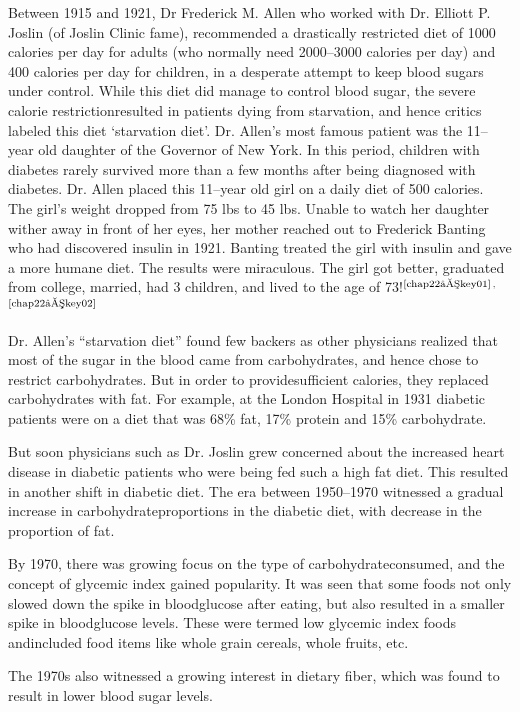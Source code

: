 Between 1915 and 1921, Dr Frederick M. Allen who worked with Dr. Elliott P. Joslin (of Joslin Clinic fame), recommended a drastically restricted diet of 1000 calories per day for adults (who normally need 2000–3000 calories per day) and 400 calories per day for children, in a desperate attempt to keep blood sugars under control. While this diet did manage to control blood sugar, the severe calorie restriction\break resulted in patients dying from starvation, and hence critics labeled this diet ‘starvation diet’. Dr. Allen’s most famous patient was the 11–year old daughter of the Governor of New York. In this period, children with diabetes rarely survived more than a few months after being dia\-gnosed with diabetes. Dr. Allen placed this 11–year old girl on a daily diet of 500 calories. The girl's weight dropped from 75 lbs to 45 lbs. Unable to watch her daughter wither away in front of her eyes, her mother reached out to Frederick Banting who had discovered insulin in 1921. Banting treated the girl with insulin and gave a more humane diet. The results were miraculous. The girl got better, graduated from college, married, had 3 children, and lived to the age of 73!$^{\text{\cite{chap22–key01}}}$$^,$$^{\text{\cite{chap22–key02}}}$

Dr. Allen’s “starvation diet” found few backers as other physicians realized that most of the sugar in the blood came from carbohydrates, and hence chose to restrict carbohydrates. But in order to provide\break sufficient calories, they replaced carbohydrates with fat. For example, at the London Hospital in 1931 diabetic patients were on a diet that was 68\% fat, 17\% protein and 15\% carbohydrate.

But soon physicians such as Dr. Joslin grew concerned about the increased heart disease in diabetic patients who were being fed such a high fat diet. This resulted in another shift in diabetic diet. The era between 1950–1970 witnessed a gradual increase in carbohydrate\break proportions in the diabetic diet, with decrease in the proportion of fat.

By 1970, there was growing focus on the type of carbohydrate\break consumed, and the concept of glycemic index gained popularity. It was seen that some foods not only slowed down the spike in blood\break glucose after eating, but also resulted in a smaller spike in blood\break glucose levels. These were termed low glycemic index foods and\break included food items like whole grain cereals, whole fruits, etc.

The 1970s also witnessed a growing interest in dietary fiber, which was found to result in lower blood sugar levels.

